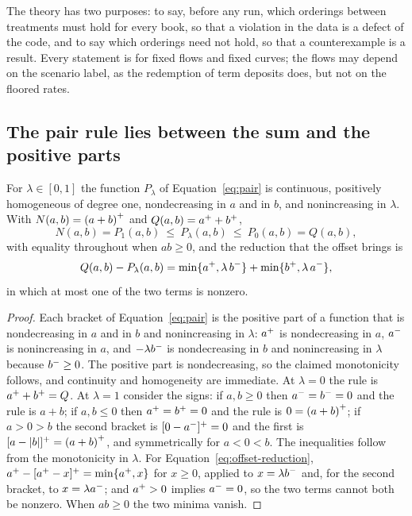 The theory has two purposes: to say, before any run, which orderings between treatments must hold for every book, so that a violation in the data is a defect of the code, and to say which orderings need not hold, so that a counterexample is a result. Every statement is for fixed flows and fixed curves; the flows may depend on the scenario label, as the redemption of term deposits does, but not on the floored rates.

\subsection{The pair rule lies between the sum and the positive parts}
\label{sec:theory-pair}

\begin{proposition}
\label{prop:pair}
For $\lambda\in[0,1]$ the function $P_\lambda$ of Equation~\eqref{eq:pair} is continuous, positively homogeneous of degree one, nondecreasing in $a$ and in $b$, and nonincreasing in $\lambda$. With $N(a,b)={(a+b)}^{+}$ and $Q(a,b)={a}^{+}+{b}^{+}$,
\begin{equation}
N(a,b)=P_1(a,b)\ \le\ P_\lambda(a,b)\ \le\ P_0(a,b)=Q(a,b),
\label{eq:sandwich}
\end{equation}
with equality throughout when $ab\ge 0$, and the reduction that the offset brings is
\begin{equation}
Q(a,b)-P_\lambda(a,b)=\min\{{a}^{+},\lambda\,{b}^{-}\}+\min\{{b}^{+},\lambda\,{a}^{-}\},
\label{eq:offset-reduction}
\end{equation}
in which at most one of the two terms is nonzero.
\end{proposition}
\begin{proof}
Each bracket of Equation~\eqref{eq:pair} is the positive part of a function that is nondecreasing in $a$ and in $b$ and nonincreasing in $\lambda$: ${a}^{+}$ is nondecreasing in $a$, ${a}^{-}$ is nonincreasing in $a$, and $-\lambda{b}^{-}$ is nondecreasing in $b$ and nonincreasing in $\lambda$ because ${b}^{-}\ge0$. The positive part is nondecreasing, so the claimed monotonicity follows, and continuity and homogeneity are immediate. At $\lambda=0$ the rule is ${a}^{+}+{b}^{+}=Q$. At $\lambda=1$ consider the signs: if $a,b\ge0$ then ${a}^{-}={b}^{-}=0$ and the rule is $a+b$; if $a,b\le0$ then ${a}^{+}={b}^{+}=0$ and the rule is $0={(a+b)}^{+}$; if $a>0>b$ the second bracket is $[0-{a}^{-}]^+=0$ and the first is $[a-|b|]^+={(a+b)}^{+}$, and symmetrically for $a<0<b$. The inequalities follow from the monotonicity in $\lambda$. For Equation~\eqref{eq:offset-reduction}, ${a}^{+}-[{a}^{+}-x]^+=\min\{{a}^{+},x\}$ for $x\ge0$, applied to $x=\lambda{b}^{-}$ and, for the second bracket, to $x=\lambda{a}^{-}$; and ${a}^{+}>0$ implies ${a}^{-}=0$, so the two terms cannot both be nonzero. When $ab\ge0$ the two minima vanish.
\end{proof}

